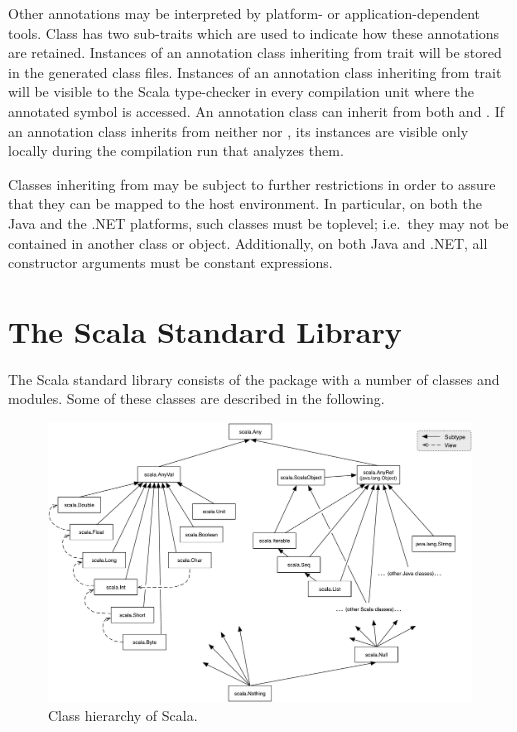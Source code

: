Other annotations may be interpreted by platform- or
application-dependent tools. Class  has two
sub-traits which are used to indicate how these annotations are
retained. Instances of an annotation class inheriting from trait
 will be stored in the generated class
files. Instances of an annotation class inheriting from trait
 will be visible to the Scala type-checker
in every compilation unit where the annotated symbol is accessed. An
annotation class can inherit from both 
and . If an annotation class inherits from
neither  nor
, its instances are visible only locally
during the compilation run that analyzes them.

Classes inheriting from  may be
subject to further restrictions in order to assure that they can be
mapped to the host environment. In particular, on both the Java and
the .NET platforms, such classes must be toplevel; i.e.\ they may not
be contained in another class or object.  Additionally, on both
Java and .NET, all constructor arguments must be constant expressions.


\chapter{The Scala Standard Library}

The Scala standard library consists of the package  with a
number of classes and modules. Some of these classes are described in
the following.

\begin{figure}
\centering
\includegraphics[scale=0.40]{classhierarchy}
\vspace*{-1.5mm}
\caption{Class hierarchy of Scala.}
\label{fig:class-hierarchy}
\end{figure}

